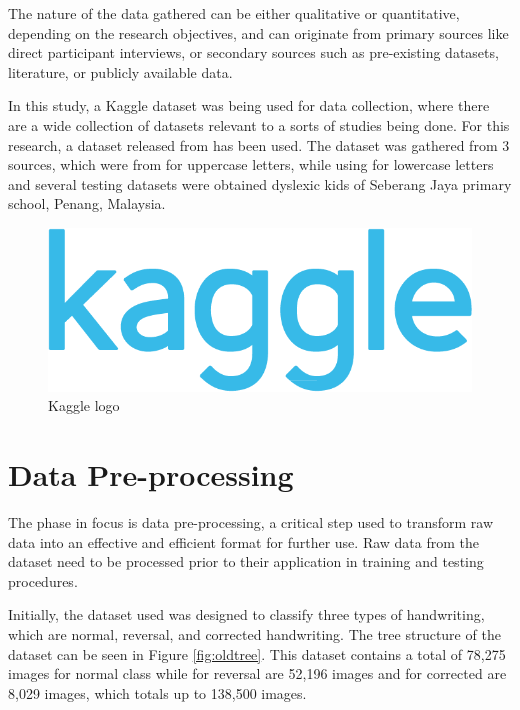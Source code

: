 The nature of the data gathered can be either qualitative or quantitative, depending on the research objectives, and can originate from primary sources like direct participant interviews, or secondary sources such as pre-existing datasets, literature, or publicly available data.

In this study, a Kaggle dataset was being used for data collection, where there are a wide collection of datasets relevant to a sorts of studies being done. For this research, a dataset released from \textcite{Isa_2022_Kaggle} has been used. The dataset was gathered from 3 sources, which were from \textcite{datasetsrc1} for uppercase letters, while using \textcite{datasetsrc2} for lowercase letters and several testing datasets were obtained dyslexic kids of Seberang Jaya primary school, Penang, Malaysia. 

\begin{figure}[h]
    \centering
    \includegraphics[scale=0.2]{mainmatter/images/research methodology/Kaggle_logo.png}
    \caption{Kaggle logo}
    \label{fig:kaggle-logo}
\end{figure}


\newpage
\section{Data Pre-processing}
The phase in focus is data pre-processing, a critical step used to transform raw data into an effective and efficient format for further use. Raw data from the dataset need to be processed prior to their application in training and testing procedures. 

Initially, the dataset used was designed to classify three types of handwriting, which are normal, reversal, and corrected handwriting. The tree structure of the dataset can be seen in Figure \ref{fig:oldtree}. This dataset contains a total of 78,275 images for normal class while for reversal are 52,196 images and for corrected are 8,029 images, which totals up to 138,500 images.

